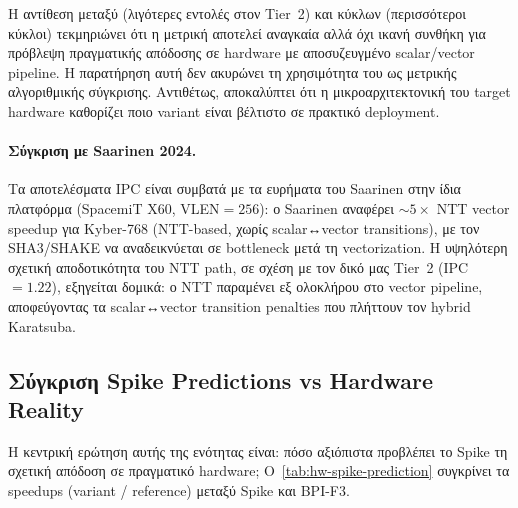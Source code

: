 Η αντίθεση μεταξύ \instret (λιγότερες εντολές στον Tier~2)
και κύκλων (περισσότεροι κύκλοι) τεκμηριώνει ότι η μετρική \instret
αποτελεί αναγκαία αλλά όχι ικανή συνθήκη για πρόβλεψη πραγματικής
απόδοσης σε hardware με αποσυζευγμένο scalar/vector pipeline. Η
παρατήρηση αυτή δεν ακυρώνει τη χρησιμότητα του \instret ως μετρικής
αλγοριθμικής σύγκρισης. Αντιθέτως, αποκαλύπτει ότι η μικροαρχιτεκτονική
του target hardware καθορίζει ποιο variant είναι βέλτιστο σε πρακτικό
deployment.

\paragraph{Σύγκριση με Saarinen 2024.}
Τα αποτελέσματα IPC είναι συμβατά με τα ευρήματα του Saarinen
\cite{Saarinen2024-vkeccak} στην ίδια πλατφόρμα (SpacemiT X60,
VLEN$= \num{256}$): ο Saarinen αναφέρει $\sim 5\times$ NTT vector speedup
για Kyber-768 (NTT-based, χωρίς scalar↔vector transitions), με τον
SHA3/SHAKE να αναδεικνύεται σε bottleneck μετά τη vectorization. Η
υψηλότερη σχετική αποδοτικότητα του NTT path, σε σχέση με τον δικό μας
Tier~2 (IPC $= 1.22$), εξηγείται δομικά: ο NTT παραμένει
εξ ολοκλήρου στο vector pipeline, αποφεύγοντας τα scalar↔vector
transition penalties που πλήττουν τον hybrid Karatsuba.

\subsection{Σύγκριση Spike Predictions vs Hardware Reality}
\label{ssec:hw-spike-vs-hw}

Η κεντρική ερώτηση αυτής της ενότητας είναι: πόσο αξιόπιστα προβλέπει
το Spike \instret τη σχετική απόδοση σε πραγματικό hardware; Ο~\cref{tab:hw-spike-prediction} συγκρίνει τα speedups (variant / reference)
μεταξύ Spike και BPI-F3.

